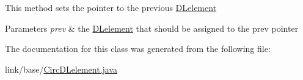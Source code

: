 This method sets the pointer to the previous \hyperlink{classbridges_1_1base_1_1_d_lelement}{D\+Lelement}


\begin{DoxyParams}{Parameters}
{\em prev} & the \hyperlink{classbridges_1_1base_1_1_d_lelement}{D\+Lelement} that should be assigned to the prev pointer \\
\hline
\end{DoxyParams}


The documentation for this class was generated from the following file\+:\begin{DoxyCompactItemize}
\item 
link/base/\hyperlink{_circ_d_lelement_8java}{Circ\+D\+Lelement.\+java}\end{DoxyCompactItemize}

